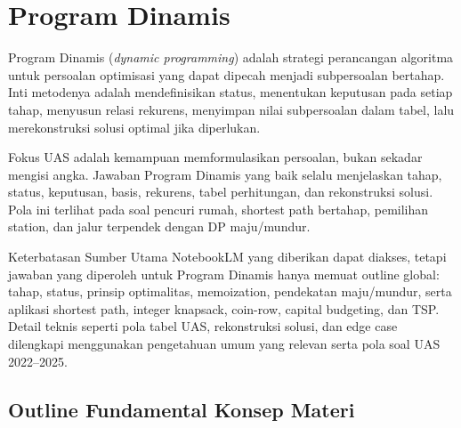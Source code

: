 \section{Program Dinamis}

Program Dinamis (\textit{dynamic programming}) adalah strategi perancangan algoritma untuk persoalan optimisasi yang dapat dipecah menjadi subpersoalan bertahap. Inti metodenya adalah mendefinisikan status, menentukan keputusan pada setiap tahap, menyusun relasi rekurens, menyimpan nilai subpersoalan dalam tabel, lalu merekonstruksi solusi optimal jika diperlukan.

Fokus UAS adalah kemampuan memformulasikan persoalan, bukan sekadar mengisi angka. Jawaban Program Dinamis yang baik selalu menjelaskan tahap, status, keputusan, basis, rekurens, tabel perhitungan, dan rekonstruksi solusi. Pola ini terlihat pada soal pencuri rumah, shortest path bertahap, pemilihan station, dan jalur terpendek dengan DP maju/mundur.

\begin{cmt}{Keterbatasan Sumber Utama}{}
NotebookLM yang diberikan dapat diakses, tetapi jawaban yang diperoleh untuk Program Dinamis hanya memuat outline global: tahap, status, prinsip optimalitas, memoization, pendekatan maju/mundur, serta aplikasi shortest path, integer knapsack, coin-row, capital budgeting, dan TSP. Detail teknis seperti pola tabel UAS, rekonstruksi solusi, dan edge case dilengkapi menggunakan pengetahuan umum yang relevan serta pola soal UAS 2022--2025.
\end{cmt}

\subsection{Outline Fundamental Konsep Materi}


